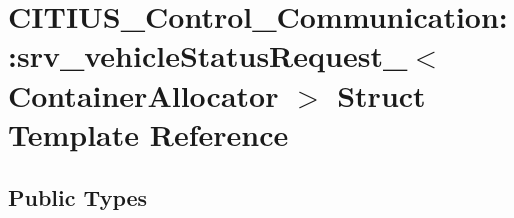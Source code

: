 \hypertarget{struct_c_i_t_i_u_s___control___communication_1_1srv__vehicle_status_request__}{\section{\-C\-I\-T\-I\-U\-S\-\_\-\-Control\-\_\-\-Communication\-:\-:srv\-\_\-vehicle\-Status\-Request\-\_\-$<$ \-Container\-Allocator $>$ \-Struct \-Template \-Reference}
\label{struct_c_i_t_i_u_s___control___communication_1_1srv__vehicle_status_request__}
}
\subsection*{\-Public \-Types}
